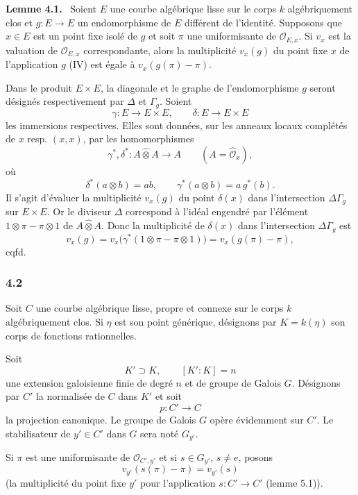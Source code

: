 \documentclass[11pt]{article}
\newenvironment{statement}[1]{\par\medskip\noindent\textbf{#1.}\ }{\par\medskip}
\begin{document}
\begin{statement}{Lemme 4.1}
Soient $E$ une courbe algébrique lisse sur le corps $k$ algébriquement clos et $g:E\to E$ un endomorphisme de $E$ différent de l'identité. Supposons que $x\in E$ est un point fixe isolé de $g$ et soit $\pi$ une uniformisante de $\mathcal O_{E,x}$. Si $v_x$ est la valuation de $\mathcal O_{E,x}$ correspondante, alors la multiplicité $v_x(g)$ du point fixe $x$ de l'application $g$ (IV) est égale à $v_x(g(\pi)-\pi)$.
\end{statement}


Dans le produit $E\times E$, la diagonale et le graphe de l'endomorphisme $g$ seront désignés respectivement par $\Delta$ et $\Gamma_g$. Soient
\[
\gamma:E\longrightarrow E\times E,\qquad
\delta:E\longrightarrow E\times E
\]
les immersions respectives. Elles sont données, sur les anneaux locaux complétés de $x$ resp. $(x,x)$, par les homomorphismes
\[
\gamma^*,\delta^*:A\widehat\otimes A\longrightarrow A
\qquad (A=\widehat{\mathcal O}_x),
\]
où
\[
\delta^*(a\otimes b)=ab,\qquad
\gamma^*(a\otimes b)=a\,g^*(b).
\]
Il s'agit d'évaluer la multiplicité $v_x(g)$ du point $\delta(x)$ dans l'intersection $\Delta\Gamma_g$ sur $E\times E$. Or le diviseur $\Delta$ correspond à l'idéal engendré par l'élément $1\otimes\pi-\pi\otimes1$ de $A\widehat\otimes A$. Donc la multiplicité de $\delta(x)$ dans l'intersection $\Delta\Gamma_g$ est
\[
v_x(g)=v_x\bigl(\gamma^*(1\otimes\pi-\pi\otimes1)\bigr)
      =v_x(g(\pi)-\pi),
\]
cqfd.

\subsubsection*{4.2}

Soit $C$ une courbe algébrique lisse, propre et connexe sur le corps $k$ algébriquement clos. Si $\eta$ est son point générique, désignons par $K=k(\eta)$ son corps de fonctions rationnelles.

Soit
\[
K'\supset K,\qquad [K':K]=n
\]
une extension galoisienne finie de degré $n$ et de groupe de Galois $G$. Désignons par $C'$ la normalisée de $C$ dans $K'$ et soit
\[
p:C'\longrightarrow C
\]
la projection canonique. Le groupe de Galois $G$ opère évidemment sur $C'$. Le stabilisateur de $y'\in C'$ dans $G$ sera noté $G_{y'}$.

Si $\pi$ est une uniformisante de $\mathcal O_{C',y'}$ et si $s\in G_{y'}$, $s\ne e$, posons
\[
v_{y'}(s(\pi)-\pi)=v_{y'}(s)
\tag{4.2.1}
\]
(la multiplicité du point fixe $y'$ pour l'application $s:C'\to C'$ (lemme 5.1)).%
\end{document}
